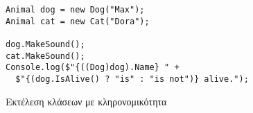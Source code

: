 \begin{listing}[htbp]
\begin{verbatim}
Animal dog = new Dog("Max");
Animal cat = new Cat("Dora");

dog.MakeSound();
cat.MakeSound();
Console.log($"{((Dog)dog).Name} " +
  $"{(dog.IsAlive() ? "is" : "is not")} alive.");
\end{verbatim}
\caption{Εκτέλεση κλάσεων με κληρονομικότητα}
\label{inheritanceExec}
\end{listing}